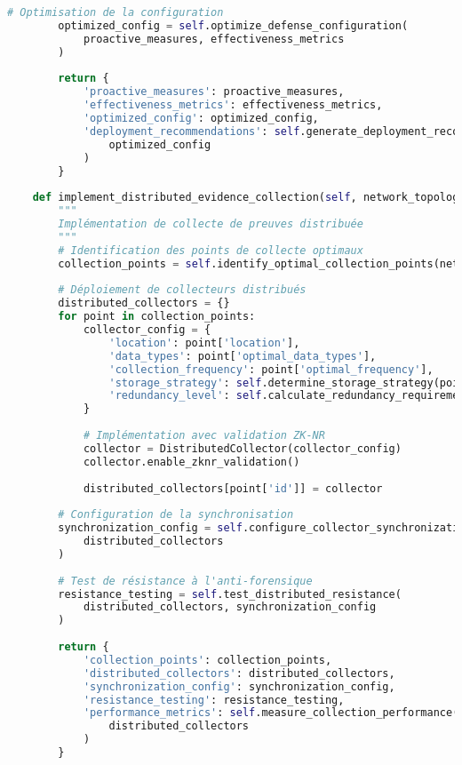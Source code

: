 \begin{lstlisting}[language=Python, caption=Système de défense adaptative contre l'anti-forensique]
        # Optimisation de la configuration
        optimized_config = self.optimize_defense_configuration(
            proactive_measures, effectiveness_metrics
        )
        
        return {
            'proactive_measures': proactive_measures,
            'effectiveness_metrics': effectiveness_metrics,
            'optimized_config': optimized_config,
            'deployment_recommendations': self.generate_deployment_recommendations(
                optimized_config
            )
        }
    
    def implement_distributed_evidence_collection(self, network_topology):
        """
        Implémentation de collecte de preuves distribuée
        """
        # Identification des points de collecte optimaux
        collection_points = self.identify_optimal_collection_points(network_topology)
        
        # Déploiement de collecteurs distribués
        distributed_collectors = {}
        for point in collection_points:
            collector_config = {
                'location': point['location'],
                'data_types': point['optimal_data_types'],
                'collection_frequency': point['optimal_frequency'],
                'storage_strategy': self.determine_storage_strategy(point),
                'redundancy_level': self.calculate_redundancy_requirements(point)
            }
            
            # Implémentation avec validation ZK-NR
            collector = DistributedCollector(collector_config)
            collector.enable_zknr_validation()
            
            distributed_collectors[point['id']] = collector
            
        # Configuration de la synchronisation
        synchronization_config = self.configure_collector_synchronization(
            distributed_collectors
        )
        
        # Test de résistance à l'anti-forensique
        resistance_testing = self.test_distributed_resistance(
            distributed_collectors, synchronization_config
        )
        
        return {
            'collection_points': collection_points,
            'distributed_collectors': distributed_collectors,
            'synchronization_config': synchronization_config,
            'resistance_testing': resistance_testing,
            'performance_metrics': self.measure_collection_performance(
                distributed_collectors
            )
        }
    

\end{lstlisting}
